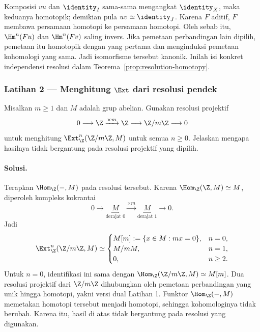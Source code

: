 Komposisi $vu$ dan $\identity_I$ sama-sama mengangkat $\identity_X$, maka
keduanya homotopik; demikian pula $uv\simeq\identity_J$. Karena $F$ aditif,
$F$ membawa persamaan homotopi ke persamaan homotopi. Oleh sebab itu,
$\Hm^n(Fu)$ dan $\Hm^n(Fv)$ saling invers. Jika pemetaan perbandingan lain
dipilih, pemetaan itu homotopik dengan yang pertama dan menginduksi pemetaan kohomologi
yang sama. Jadi isomorfisme tersebut kanonik. Inilah isi konkret independensi
resolusi dalam Teorema~\ref{prop:resolution-homotopy}.

\subsubsection*{Latihan 2 --- Menghitung $\Ext$ dari resolusi pendek}
\hypertarget{o014.mastery.derived-spectral.002.ex02}{ }
\label{mastery:derived-spectral-002-ex02}

Misalkan $m\geq1$ dan $M$ adalah grup abelian. Gunakan resolusi projektif
\[
	0\longrightarrow\Z\xrightarrow{\times m}\Z
	\longrightarrow\Z/m\Z\longrightarrow0
\]
untuk menghitung $\Ext^n_{\Z}(\Z/m\Z,M)$ untuk semua $n\geq0$.
Jelaskan mengapa hasilnya tidak bergantung pada resolusi projektif yang
dipilih.

\paragraph{Solusi.}
\hypertarget{o014.mastery.derived-spectral.002.sol02}{ }
Terapkan $\Hom_{\Z}(-,M)$ pada resolusi tersebut. Karena
$\Hom_{\Z}(\Z,M)\simeq M$, diperoleh kompleks kokrantai
\[
	0\longrightarrow
	\underbracket{M}_{\text{derajat }0}
	\xrightarrow{\times m}
	\underbracket{M}_{\text{derajat }1}
	\longrightarrow0.
\]
Jadi
\[
	\Ext^n_{\Z}(\Z/m\Z,M)\simeq
	\begin{cases}
		M[m]:=\{x\in M:mx=0\},&n=0,\\
		M/mM,&n=1,\\
		0,&n\geq2.
	\end{cases}
\]
Untuk $n=0$, identifikasi ini sama dengan
$\Hom_{\Z}(\Z/m\Z,M)\simeq M[m]$. Dua resolusi projektif dari
$\Z/m\Z$ dihubungkan oleh pemetaan perbandingan yang unik hingga homotopi,
yakni versi dual Latihan 1. Funktor $\Hom_{\Z}(-,M)$ memetakan homotopi
tersebut menjadi homotopi, sehingga kohomologinya tidak berubah. Karena itu, hasil di atas
tidak bergantung pada resolusi yang digunakan.

